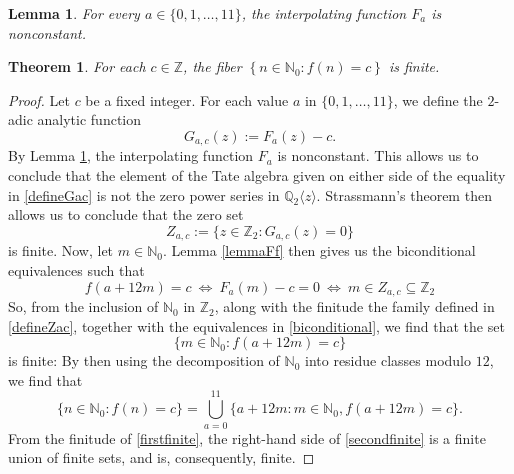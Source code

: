 \documentclass[10pt,a4paper]{amsart}
\newtheorem{lemma}{Lemma}
\newtheorem{theorem}{Theorem}
\begin{document}
\begin{lemma}\label{lemmainterpolate}
 For every $a \in \{ 0, 1, \ldots, 11 \}$, the interpolating function $F_{a}$ 
 is nonconstant. 
\end{lemma}

\begin{theorem}\label{maintheorem}
 For each $c \in \mathbb{Z}$, the fiber
$ \left\{ n \in \mathbb{N}_{0} : f(n) = c \right\} $ is finite. 
\end{theorem}

\begin{proof}
 Let $c$ be a fixed integer. For each value $ a$ in $ \{ 0, 1, \ldots, 11 \}$, 
 we define the $2$-adic analytic function 
\begin{equation}\label{defineGac} 
 G_{a, c}(z) := F_{a}(z) - c. 
\end{equation}
 By Lemma \ref{lemmainterpolate}, 
 the interpolating function $F_{a}$ is nonconstant. 
 This allows us to conclude that 
 the element of the Tate algebra given on either side of the equality in \eqref{defineGac} 
 is not the zero power series in $\mathbb{Q}_{2}\langle z \rangle$. 
 Strassmann's theorem then allows us to conclude that the zero set
\begin{equation}\label{defineZac}
 Z_{a, c} := \{ z \in \mathbb{Z}_{2} : G_{a, c}(z) = 0 \} 
\end{equation}
 is finite. 
 Now, let $m \in \mathbb{N}_{0}$. 
 Lemma \ref{lemmaFf} then gives us the biconditional equivalences such that 
\begin{equation}\label{biconditional}
 f(a+12m) = c 
 \ \Longleftrightarrow 
 \ F_{a}(m) - c = 0 
 \ \Longleftrightarrow \ m \in Z_{a, c} \subseteq \mathbb{Z}_{2}
\end{equation}
 So, from the inclusion of $\mathbb{N}_{0}$ in $\mathbb{Z}_{2}$, 
 along with the finitude the family defined in \eqref{defineZac}, together with the equivalences in 
 \eqref{biconditional}, we find that the set 
\begin{equation}\label{firstfinite}
 \{ m \in \mathbb{N}_{0} : f(a + 12 m) = c \} 
\end{equation}
 is finite: 
 By then using the decomposition of $\mathbb{N}_{0}$ into residue classes modulo $12$, 
 we find that 
\begin{equation}\label{secondfinite} 
 \{ n \in \mathbb{N}_{0} : f(n) = c \} 
 = \bigcup_{a=0}^{11} \{ a + 12 m : m \in \mathbb{N}_{0}, f(a + 12 m) = c \}.
\end{equation}
 From the finitude of \eqref{firstfinite}, 
 the right-hand side of \eqref{secondfinite} 
 is a finite union of finite sets, and is, consequently, finite. 
\end{proof}
\end{document}
